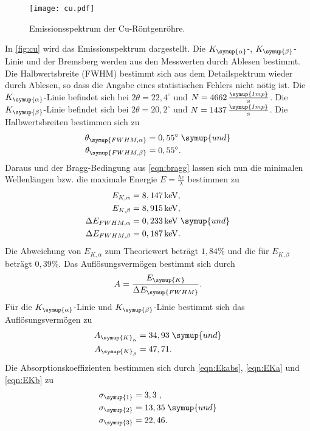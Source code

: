 \begin{figure}
  \centering
  \texttt{[image: cu.pdf]}
  \caption{Emissionsspektrum der Cu-Röntgenröhre.}
  \label{fig:cu}
\end{figure}
In \autoref{fig:cu} wird das Emissionspektrum dargestellt. Die $K_{\symup{\alpha}}$-, $K_{\symup{\beta}}$-Linie und
der Bremsberg werden aus den Messwerten durch Ablesen bestimmt. Die Halbwertsbreite (FWHM) bestimmt sich aus dem
Detailspektrum wieder durch Ablesen, so dass die Angabe eines statistischen Fehlers nicht nötig ist.
Die $K_{\symup{\alpha}}$-Linie befindet sich bei $2\theta=22,4^{\circ}$ und 
$N = 4662\,\frac{\symup{Imp}}{\unit{\second}}$. Die $K_{\symup{\beta}}$-Linie befindet sich bei 
$2\theta=20,2^{\circ}$ und $N = 1437\,\frac{\symup{Imp}}{\unit{\second}}$. Die Halbwertsbreiten bestimmen sich zu
\begin{align*}
  \theta_{\symup{FWHM, \alpha}} &= 0,55^{\circ} \; \symup{und} \\
  \theta_{\symup{FWHM, \beta}} &= 0,55^{\circ}. 
\end{align*}
Daraus und der Bragg-Bedingung aus \autoref{eqn:bragg} lassen sich nun die minimalen Wellenlängen bzw.
die maximale Energie $E = \frac{hc}{\lambda}$ bestimmen zu
\begin{align*}
  E_{K,\alpha}           &= 8,147\,\unit{\kilo\eV},\\
  E_{K, \beta}           &= 8,915\,\unit{\kilo\eV},\\
  \Delta E_{FWHM,\alpha} &= 0,233\,\unit{\kilo\eV} \; \symup{und}\\
  \Delta E_{FWHM,\beta}  &= 0,187\,\unit{\kilo\eV}.
\end{align*}
Die Abweichung von $E_{K,\alpha}$ zum Theoriewert beträgt $1,84\%$ und die für $E_{K, \beta}$ beträgt
$0,39\%$.
Das Auflösungsvermögen bestimmt sich durch
\begin{align*}
  A = \frac{E_{\symup{K}}}{\Delta E_{\symup{FWHM}}}.
\end{align*}
Für die $K_{\symup{\alpha}}$-Linie und $K_{\symup{\beta}}$-Linie bestimmt sich das Auflösungsvermögen zu
\begin{align*}
  A_{\symup{K}_{\alpha}}  &=  34,93 \; \symup{und}\\
  A_{\symup{K}_{\beta}}   &= 47,71.
\end{align*}
Die Absorptionskoeffizienten bestimmen sich durch \autoref{eqn:Ekabs}, \autoref{eqn:EKa} und
\autoref{eqn:EKb} zu
\begin{align*}
  \sigma_{\symup{1}} &= 3,3\;,\\
  \sigma_{\symup{2}} &= 13,35\; \symup{und}\\
  \sigma_{\symup{3}} &= 22,46.
\end{align*}

